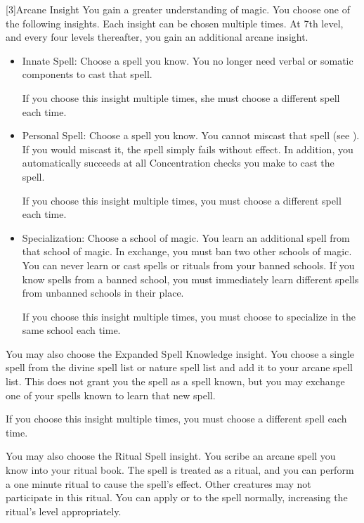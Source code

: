             [3]{Arcane Insight} 
            You gain a greater understanding of magic.
            You choose one of the following insights.
            Each insight can be chosen multiple times.
            At 7th level, and every four levels thereafter, you gain an additional arcane insight.
            \begin{itemize}
                \item Innate Spell: Choose a spell you know.
                    You no longer need verbal or somatic components to cast that spell.
                    \par If you choose this insight multiple times, she must choose a different spell each time.
                \item Personal Spell: Choose a spell you know.
                    You cannot miscast that spell (see ).
                    If you would miscast it, the spell simply fails without effect.
                    In addition, you automatically succeeds at all Concentration checks you make to cast the spell.
                    \par If you choose this insight multiple times, you must choose a different spell each time.
                \item Specialization: Choose a school of magic.
                    You learn an additional spell from that school of magic.
                    In exchange, you must ban two other schools of magic.
                    You can never learn or cast spells or rituals from your banned schools.
                    If you know spells from a banned school, you must immediately learn different spells from unbanned schools in their place.
                    \par If you choose this insight multiple times, you must choose to specialize in the same school each time.
            \end{itemize}

             You may also choose the Expanded Spell Knowledge insight.
            You choose a single spell from the divine spell list or nature spell list and add it to your arcane spell list.
            This does not grant you the spell as a spell known, but you may exchange one of your spells known to learn that new spell.
            \par If you choose this insight multiple times, you must choose a different spell each time.

             You may also choose the Ritual Spell insight.
            You scribe an arcane spell you know into your ritual book.
            The spell is treated as a ritual, and you can perform a one minute ritual to cause the spell's effect.
            Other creatures may not participate in this ritual.
            You can apply  or  to the spell normally, increasing the ritual's level appropriately.

